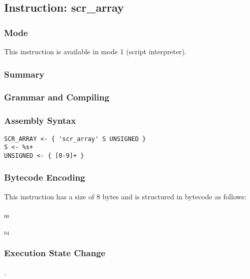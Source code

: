 \subsection{Instruction: scr\_array}

\subsubsection{Mode}
This instruction is available in mode 1 (script interpreter).
\subsubsection{Summary}


\subsubsection{Grammar and Compiling}


\subsubsection{Assembly Syntax}

\begin{myquote}
\begin{verbatim}
SCR_ARRAY <- { 'scr_array' S UNSIGNED }
S <- %s+
UNSIGNED <- { [0-9]+ }
\end{verbatim}
\end{myquote}

\subsubsection{Bytecode Encoding}

This instruction has a size of 8 bytes and is structured in bytecode as follows:

$_{00}$\ 



$_{04}$\ 

\subsubsection{Execution State Change}

.


